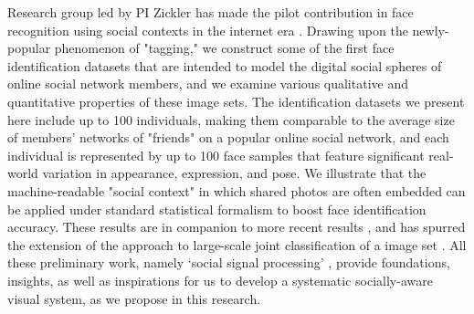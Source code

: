 Research group led by PI Zickler has made the pilot contribution in face recognition using social contexts in the internet era \cite{Stone2008,Stone2010}. Drawing upon the newly-popular phenomenon of "tagging," we construct some of the first face identification datasets that are intended to model the digital social spheres of online social network members, and we examine various qualitative and quantitative properties of these image sets. The identification datasets we present here include up to 100 individuals, making them comparable to the average size of members' networks of "friends" on a popular online social network, and each individual is represented by up to 100 face samples that feature significant real-world variation in appearance, expression, and pose. We illustrate that the machine-readable "social context" in which shared photos are often embedded can be applied under standard statistical formalism to boost face identification accuracy. These results are in companion to more recent results \cite{Dikmen:classify,LeeBMVC2011,Murillo2012,Poppe2012}, and has spurred the extension of the approach to large-scale joint classification of a image set \cite{McAuley:socialclassify}. All these preliminary work, namely `social signal processing' \cite{Pantic}, provide foundations, insights, as well as inspirations for us to develop a systematic socially-aware visual system, as we propose in this research.
